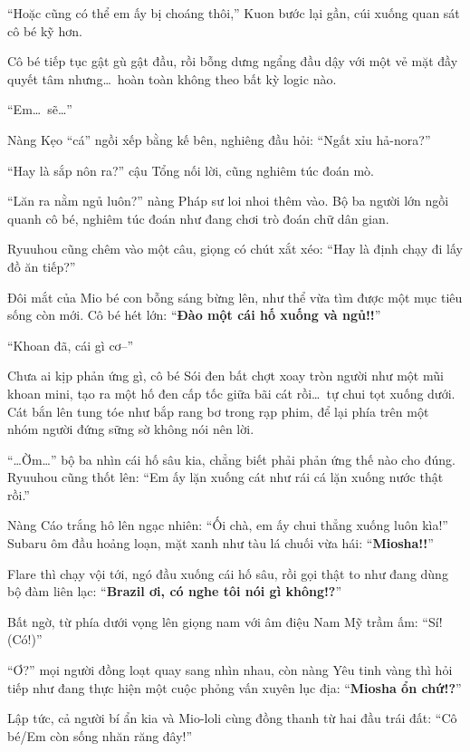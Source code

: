 \documentclass[../main.tex]{subfiles}
\begin{document}
``Hoặc cũng có thể em ấy bị choáng thôi,'' Kuon bước lại gần, cúi xuống quan sát cô bé kỹ hơn.

Cô bé tiếp tục gật gù gật đầu, rồi bỗng dưng ngẩng đầu dậy với một vẻ mặt đầy quyết tâm nhưng\dots\ hoàn toàn không theo bất kỳ logic nào.

``Em\dots\ sẽ\dots''

Nàng Kẹo ``cá'' ngồi xếp bằng kế bên, nghiêng đầu hỏi: ``Ngất xỉu hả-nora?''

``Hay là sắp nôn ra?'' cậu Tổng nối lời, cũng nghiêm túc đoán mò.

``Lăn ra nằm ngủ luôn?'' nàng Pháp sư loi nhoi thêm vào. Bộ ba người lớn ngồi quanh cô bé, nghiêm túc đoán như đang chơi trò đoán chữ dân gian.

Ryuuhou cũng chêm vào một câu, giọng có chút xắt xéo: ``Hay là định chạy đi lấy đồ ăn tiếp?''

Đôi mắt của Mio bé con bỗng sáng bừng lên, như thể vừa tìm được một mục tiêu sống còn mới. Cô bé hét lớn: ``\textbf{Đào một cái hố xuống và ngủ!!}''

``Khoan đã, cái gì cơ--''

Chưa ai kịp phản ứng gì, cô bé Sói đen bất chợt xoay tròn người như một mũi khoan mini, tạo ra một hố đen cấp tốc giữa bãi cát rồi\dots\ tự chui tọt xuống dưới. Cát bắn lên tung tóe như bắp rang bơ trong rạp phim, để lại phía trên một nhóm người đứng sững sờ không nói nên lời.


``\dots Ờm\dots'' bộ ba nhìn cái hố sâu kia, chẳng biết phải phản ứng thế nào cho đúng. Ryuuhou cũng thốt lên: ``Em ấy lặn xuống cát như rái cá lặn xuống nước thật rồi.''

Nàng Cáo trắng hô lên ngạc nhiên: ``Ối chà, em ấy chui thẳng xuống luôn kìa!'' Subaru ôm đầu hoảng loạn, mặt xanh như tàu lá chuối vừa hái: ``\textbf{Miosha!!}''

Flare thì chạy vội tới, ngó đầu xuống cái hố sâu, rồi gọi thật to như đang dùng bộ đàm liên lạc: ``\textbf{Brazil ơi, có nghe tôi nói gì không!?}''

Bất ngờ, từ phía dưới vọng lên giọng nam với âm điệu Nam Mỹ trầm ấm: ``Sí! (Có!)''

``Ơ?'' mọi người đồng loạt quay sang nhìn nhau, còn nàng Yêu tinh vàng thì hỏi tiếp như đang thực hiện một cuộc phỏng vấn xuyên lục địa: ``\textbf{Miosha ổn chứ!?}''

Lập tức, cả người bí ẩn kia và Mio-loli cùng đồng thanh từ hai đầu trái đất: ``Cô bé/Em còn sống nhăn răng đây!''
\end{document}
